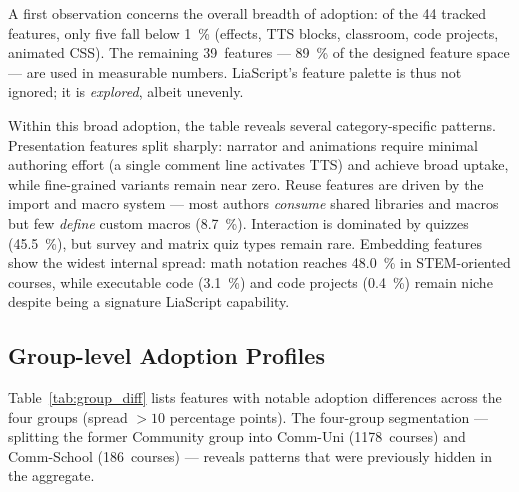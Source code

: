 A first observation concerns the overall breadth of adoption:
of the \num{44} tracked features, only five fall below
\SI{1}{\percent} (effects, TTS blocks, classroom, code projects,
animated CSS).
The remaining 39~features --- \SI{89}{\percent} of the designed feature
space --- are used in measurable numbers.
LiaScript's feature palette is thus not ignored; it is \emph{explored},
albeit unevenly.

Within this broad adoption, the table reveals several category-specific
patterns.
\textcolor{catPresentation}{Presentation} features split sharply: narrator
and animations require minimal authoring effort (a single comment line
activates TTS) and achieve broad uptake, while fine-grained variants
remain near zero.
\textcolor{catReuse}{Reuse} features are driven by the import and macro system
--- most authors \emph{consume} shared libraries and macros but few
\emph{define} custom macros (\SI{8.7}{\percent}).
\textcolor{catInteraction}{Interaction} is dominated by quizzes
(\SI{45.5}{\percent}), but survey and matrix quiz types remain rare.
\textcolor{catEmbedding}{Embedding} features show the widest internal
spread: math notation reaches \SI{48.0}{\percent} in STEM-oriented
courses, while executable code (\SI{3.1}{\percent}) and code projects
(\SI{0.4}{\percent}) remain niche despite being a signature LiaScript
capability.

\subsection{Group-level Adoption Profiles}
\label{sec:profiles}

Table~\ref{tab:group_diff} lists features with notable adoption
differences across the four groups (spread $> 10$ percentage points).
The four-group segmentation --- splitting the former Community group
into Comm-Uni (\num{1178}~courses) and Comm-School (\num{186}~courses)
--- reveals patterns that were previously hidden in the aggregate.

